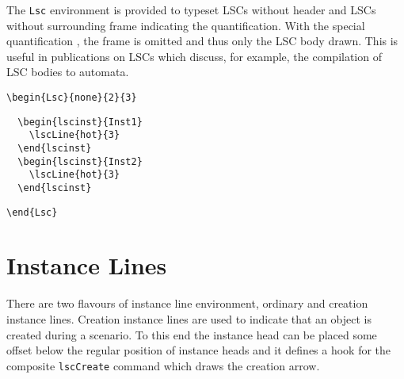 \documentclass{article}
\newcommand{\bs}{\usebox{\bsbox}}
\newcommand{\env}[1]{\texttt{#1}}
\newcommand{\cmd}[1]{\bs\texttt{#1}}
\newcommand{\con}[1]{%
  \ifmmode{\texttt{#1}}\else{`\texttt{#1}'}\fi}
\newcommand{\mlscCreate}{\cmd{lscCreate}}
\newcommand{\mLsc}{\env{Lsc}}
\newcommand{\mnone}{\con{none}}%
\begin{document}
The \mLsc{} environment is provided to typeset LSCs without header and LSCs
without surrounding frame indicating the quantification.
%
With the special quantification \mnone{}, the frame is omitted and thus only
the LSC body drawn.
%
This is useful in publications on LSCs which discuss, for example, the
compilation of LSC bodies to automata.

\begin{center}%
\begin{minipage}{0.45\textwidth}%
\end{minipage}%
\hfill%
\begin{minipage}{0.375\textwidth}%
\small%
\begin{verbatim}
\begin{Lsc}{none}{2}{3}
\end{verbatim}%
\verbunskip%
{\gray%
\begin{verbatim}
  \begin{lscinst}{Inst1}
    \lscLine{hot}{3}
  \end{lscinst}
  \begin{lscinst}{Inst2}
    \lscLine{hot}{3}
  \end{lscinst}
\end{verbatim}}%
\verbunskip%
\begin{verbatim}
\end{Lsc}
\end{verbatim}
\end{minipage}
\end{center}%


\section{Instance Lines}
\label{sec:inst}

There are two flavours of instance line environment, ordinary and creation
instance lines.
%
Creation instance lines are used to indicate that an object is created during
a scenario.
%
To this end the instance head can be placed some offset below the regular
position of instance heads and it defines a hook for the composite
\mlscCreate{} command which draws the creation arrow.
\end{document}
